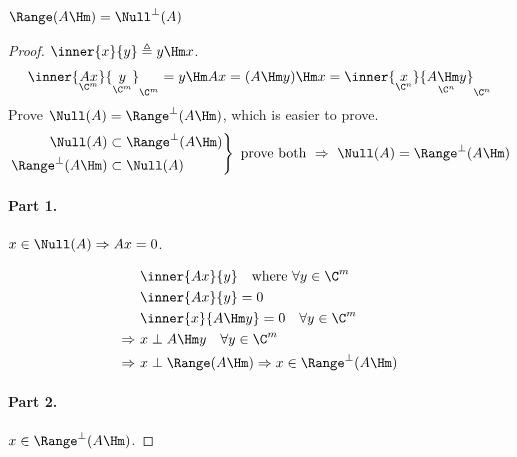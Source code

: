 \begin{theorem}
$\Range(A\Hm)=\Null^\perp(A)$
\end{theorem}
\begin{proof}
$\inner{x}{y}\triangleq y\Hm x$.
\[
\inner{\underset{\C^m}{Ax}}{\underset{\C^m}{y}}_{\C^m}=y\Hm Ax=(A\Hm y)\Hm x=\inner{\underset{\C^n}{x}}{\underset{\C^n}{A\Hm y}}_{\C^n}
\]
Prove $\Null(A)=\Range^\perp(A\Hm)$, which is easier to prove.
\[
\left.\begin{aligned}
\Null(A)&\subset\Range^\perp(A\Hm)\\
\Range^\perp(A\Hm)&\subset\Null(A)
\end{aligned}\right\}\ \text{prove both}\ \Rightarrow\ \Null(A)=\Range^\perp(A\Hm)
\]

\paragraph{Part 1.} $x\in\Null(A)\Rightarrow Ax=0$.

\begin{minipage}{0.25\textwidth}
\centering
{}
\end{minipage}\hfill
\begin{minipage}{0.72\textwidth}
\begin{align*}
&\inner{Ax}{y}\quad\text{where }\forall y\in\C^m\\
&\inner{Ax}{y}=0\\
&\inner{x}{A\Hm y}=0\quad\forall y\in\C^m\\
\Rightarrow\ & x\perp A\Hm y\quad\forall y\in\C^m\\
\Rightarrow\ & x\perp\Range(A\Hm)\Rightarrow x\in\Range^\perp(A\Hm)
\end{align*}
\end{minipage}

\paragraph{Part 2.} $x\in\Range^\perp(A\Hm)$.


\end{proof}
